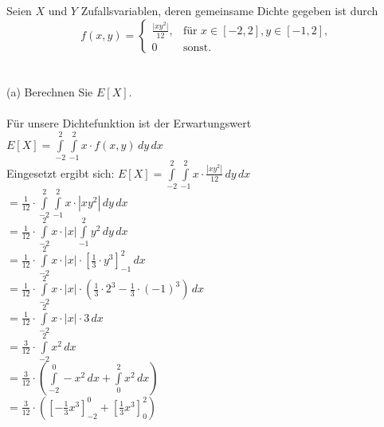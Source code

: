 \documentclass[a4paper]{article}
\begin{document}
\subsection{}
Seien $X$ und $Y$ Zufallsvariablen, deren gemeinsame Dichte gegeben ist durch
\[f(x,y)=\begin{cases}
\frac{\vert xy^2\vert}{12}, & \text{für } x \in [-2,2],y \in [-1,2],\\
0 & \text{sonst.}    
\end{cases}\]\\\\
(a) Berechnen Sie $E[X]$.\\\\
Für unsere Dichtefunktion ist der Erwartungswert $E[X] = \int\limits^2_{-2} \int\limits^2_{-1} x \cdot f(x,y) \, dy \,  dx$\\
Eingesetzt ergibt sich: $E[X] = \int\limits^2_{-2} \int\limits^2_{-1} x \cdot \frac{\left| xy^2\right|}{12} \, dy \, dx$\\
\hspace*{3.57cm}$= \frac{1}{12} \cdot \int\limits^2_{-2} \int\limits^2_{-1} x \cdot \left| xy^2\right| \, dy \, dx$\\
\hspace*{3.57cm}$= \frac{1}{12} \cdot \int\limits^2_{-2} x \cdot \left| x \right| \int\limits^2_{-1} y^2 \, dy \, dx$\\
\hspace*{3.57cm}$= \frac{1}{12} \cdot \int\limits^2_{-2} x \cdot \left| x \right| \cdot \left[ \frac{1}{3} \cdot y^3\right]^2_{-1} \, dx$\\
\hspace*{3.57cm}$= \frac{1}{12} \cdot \int\limits^2_{-2} x \cdot \left| x \right| \cdot \left( \frac{1}{3} \cdot 2^3 - \frac{1}{3} \cdot (-1)^3 \right) \, dx$\\
\hspace*{3.57cm}$= \frac{1}{12} \cdot \int\limits^2_{-2} x \cdot \left| x \right| \cdot 3 \, dx$\\
\hspace*{3.57cm}$= \frac{3}{12} \cdot \int\limits^2_{-2} x^2 \, dx$\\
\hspace*{3.57cm}$= \frac{3}{12} \cdot \left( \int\limits^0_{-2} -x^2 \, dx + \int\limits^2_0 x^2 \, dx \right)$\\
\hspace*{3.57cm}$= \frac{3}{12} \cdot \left( \left[- \frac{1}{3} x^3 \right]^0_{-2} + \left[ \frac{1}{3} x^3 \right]^2_0 \right)$\\
\end{document}
